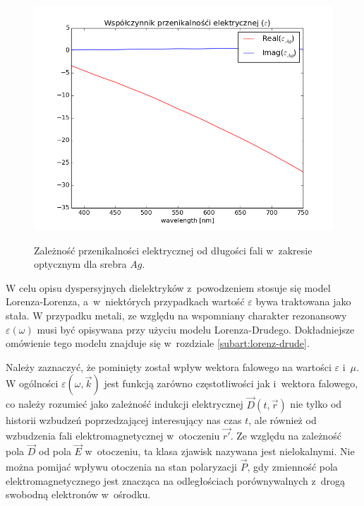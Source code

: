 \begin{figure}[tb]
	\includegraphics[width=\textwidth]{images/agtio2eps.png}
	\label{fig:agtio2eps}
	\caption{Zależność przenikalności elektrycznej od długości fali w~zakresie optycznym dla srebra $Ag$\cite{PhysRevB.6.4370}. }  
\end{figure}
W celu opisu dyspersyjnych dielektryków z~powodzeniem stosuje się model Lorenza-Lorenza, a~w~niektórych przypadkach wartość $\varepsilon$ bywa traktowana jako stała. W przypadku metali, ze względu na wspomniany charakter rezonansowy $\varepsilon(\omega)$  musi być opisywana przy użyciu modelu Lorenza-Drudego. Dokładniejsze omówienie tego modelu znajduje się w~rozdziale \ref{subart:lorenz-drude}.

Należy zaznaczyć, że pominięty został wpływ wektora falowego na wartości $\varepsilon$ i~$\mu$. W ogólności $\varepsilon(\omega,\vec{k})$ jest funkcją zarówno częstotliwości jak i~wektora falowego, co należy rozumieć jako zależność indukcji elektrycznej $\vec{D}(t,\vec{r})$ nie tylko od historii wzbudzeń poprzedzającej interesujący nas czas $t$, ale również od wzbudzenia fali elektromagnetycznej w~otoczeniu $\vec{r'}$. Ze względu na zależność pola $\vec{D}$ od pola $\vec{E}$ w~otoczeniu, ta klasa zjawisk nazywana jest nielokalnymi. Nie można pomijać wpływu otoczenia na stan polaryzacji $\vec{P}$, gdy zmienność pola elektromagnetycznego jest znacząca na odległościach porównywalnych z~drogą swobodną elektronów w~ośrodku.



